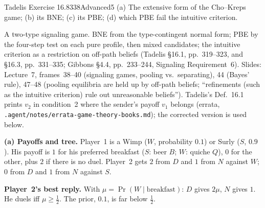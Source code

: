 \begin{exsol}{Tadelis Exercise 16.8}{338}{Advanced}{5}
\asked (a) The extensive form of the Cho--Kreps game; (b) its BNE; (c) its PBE; (d) which PBE fail the intuitive
criterion.

\method A two-type signaling game. BNE from the type-contingent normal form; PBE by the four-step test on each
pure profile, then mixed candidates; the intuitive criterion as a restriction on off-path beliefs (Tadelis \S16.1,
pp.~319--323, and \S16.3, pp.~331--335; Gibbons \S4.4, pp.~233--244, Signaling Requirement~6). Slides: Lecture~7,
frames~38--40 (signaling games, pooling vs.\ separating), 44 (Bayes' rule), 47--48 (pooling equilibria are held up
by off-path beliefs; ``refinements (such as the intuitive criterion) rule out unreasonable beliefs''). Tadelis's
Def.~16.1 prints $v_2$ in condition~2 where the sender's payoff $v_1$ belongs (errata,
\texttt{.agent/notes/errata-game-theory-books.md}); the corrected version is used below.

\solution
\textbf{(a) Payoffs and tree.} Player~1 is a Wimp ($W$, probability $0.1$) or Surly ($S$, $0.9$). His payoff is
$1$ for his preferred breakfast ($S$: beer $B$; $W$: quiche $Q$), $0$ for the other, plus $2$ if there is no duel.
Player~2 gets $2$ from $D$ and $1$ from $N$ against $W$; $0$ from $D$ and $1$ from $N$ against $S$.
\begin{center}
\end{center}
\textbf{Player~2's best reply.} With $\mu = \Pr(W \mid \text{breakfast})$: $D$ gives $2\mu$, $N$ gives $1$. He duels
iff $\mu \ge \frac12$. The prior, $0.1$, is far below $\frac12$.


\end{exsol}
